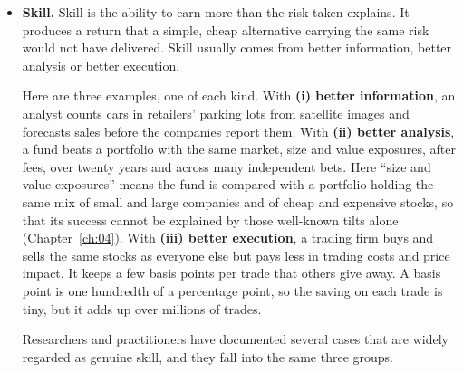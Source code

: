 \begin{itemize}
  \item \textbf{Skill.} Skill is the ability to earn more than the risk taken
  explains. It produces a return that a simple, cheap alternative carrying the
  same risk would not have delivered. Skill usually comes from better
  information, better analysis or better execution.

  Here are three examples, one of each kind. 
  With \textbf{(i) better
  information}, an analyst counts cars in retailers' parking lots from
  satellite images and forecasts sales before the companies report them.
  With \textbf{(ii) better analysis}, a fund beats a portfolio with the same
  market, size and value exposures, after fees, over twenty years and across
  many independent bets. Here ``size and value exposures'' means the fund is
  compared with a portfolio holding the same mix of small and large companies
  and of cheap and expensive stocks, so that its success cannot be explained
  by those well-known tilts alone (Chapter~\ref{ch:04}).
  With \textbf{(iii) better execution}, a trading firm
  buys and sells the same stocks as everyone else but pays less in trading
  costs and price impact. It keeps a few basis points per trade that others
  give away. A basis point is one hundredth of a percentage point, so the
  saving on each trade is tiny, but it adds up over millions of trades.

  
  Researchers and practitioners have documented several cases that are widely
  regarded as genuine skill, and they fall into the same three groups.
  

\end{itemize}
